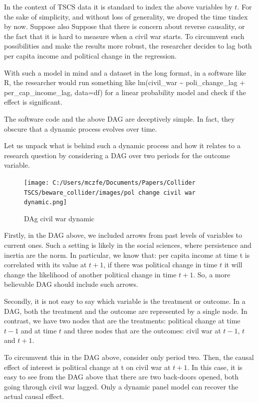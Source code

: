 \documentclass[
  super,
  preprint,
  3p]{elsarticle}
\begin{document}
In the context of TSCS data it is standard to index the above variables
by \(t\). For the sake of simplicity, and without loss of generality, we
droped the time tindex by now. Suppose also Suppose that there is
concern about reverse causality, or the fact that it is hard to measure
when a civil war starts. To circumvent such possibilities and make the
results more robust, the researcher decides to lag both per capita
income and political change in the regression.

With such a model in mind and a dataset in the long format, in a
software like R, the researcher would run something like lm(civil\_war
\textasciitilde{} poli\_change\_lag + per\_cap\_income\_lag, data=df)
for a linear probability model and check if the effect is significant.

The software code and the above DAG are deceptively simple. In fact,
they obscure that a dynamic process evolves over time.

Let us unpack what is behind such a dynamic process and how it relates
to a research question by considering a DAG over two periods for the
outcome variable.

\begin{figure}

{\centering \texttt{[image: C:/Users/mczfe/Documents/Papers/Collider TSCS/beware\_collider/images/pol change civil war dynamic.png]}

}

\caption{DAg civil war dynamic}

\end{figure}

Firstly, in the DAG above, we included arrows from past levels of
variables to current ones. Such a setting is likely in the social
sciences, where persistence and inertia are the norm. In particular, we
know that: per capita income at time t is correlated with its value at
\(t +1\), if there was political change in time \(t\) it will change the
likelihood of another political change in time \(t + 1\). So, a more
believable DAG should include such arrows.

Secondly, it is not easy to say which variable is the treatment or
outcome. In a DAG, both the treatment and the outcome are represented by
a single node. In contrast, we have two nodes that are the treatments:
political change at time \(t -1\) and at time \(t\) and three nodes that
are the outcomes: civil war at \(t -1\), \(t\) and \(t +1\).

To circumvent this in the DAG above, consider only period two. Then, the
causal effect of interest is political change at t on civil war at
\(t +1\). In this case, it is easy to see from the DAG above that there
are two back-doors opened, both going through civil war lagged. Only a
dynamic panel model can recover the actual causal effect.
\end{document}
